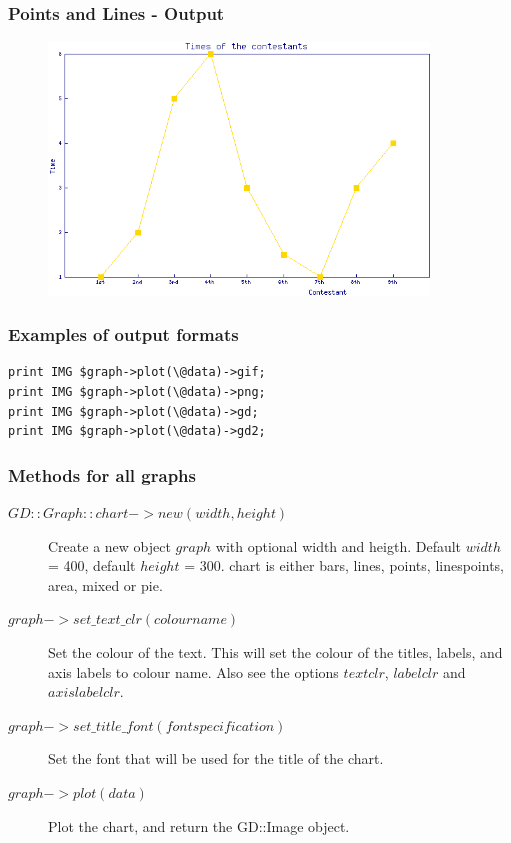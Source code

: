 \documentclass{beamer}
\begin{document}
\begin{frame} \frametitle{Points and Lines - Output}
\begin{figure}[htbp]
\begin{center}
\includegraphics[width=0.9\textwidth]{image/4.png}
\end{center}
\end{figure}
\end{frame}

\begin{frame}[fragile] \frametitle{Examples of output formats}
\begin{lstlisting}[language=perl_u,breaklines=true]
print IMG $graph->plot(\@data)->gif;
print IMG $graph->plot(\@data)->png;
print IMG $graph->plot(\@data)->gd;
print IMG $graph->plot(\@data)->gd2;
\end{lstlisting}
\end{frame}

\begin{frame} \frametitle{Methods for all graphs}
\begin{description}
\item[$GD::Graph::chart->new(width,height)$] Create a new object $graph$ with optional width and heigth. Default $width$ = 400, default $height$ = 300. chart is either bars, lines, points, linespoints, area, mixed or pie.
\item[$graph->set\_text\_clr(colour name)$] Set the colour of the text. This will set the colour of the titles, labels, and axis labels to colour name. Also see the options $textclr$, $labelclr$ and $axislabelclr$.
\item[$graph->set\_title\_font(font specification)$] Set the font that will be used for the title of the chart.
\item[$graph->plot(data)$] Plot the chart, and return the GD::Image object.
\end{description}
\end{frame}
\end{document}
